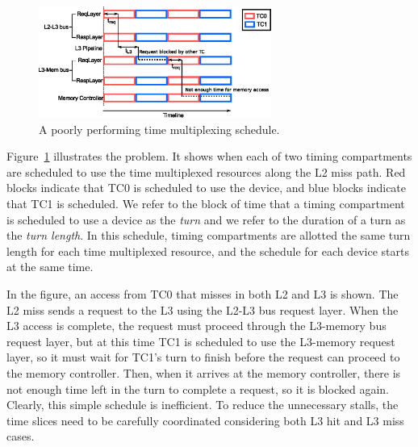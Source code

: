 \begin{figure}
    \begin{center}
        \includegraphics[width=3.0in]{figs/problem.eps}
        \caption{A poorly performing time multiplexing schedule.}
        \label{fig:problem}
		\vspace{-0.2in}
    \end{center}
\end{figure}

Figure~\ref{fig:problem} illustrates the problem. It shows when each of two 
timing compartments are scheduled to use the time multiplexed resources along 
the L2 miss path. Red blocks indicate that TC0 is scheduled to use the device, 
and blue blocks indicate that TC1 is scheduled. We refer to the block of time 
that a timing compartment is scheduled to use a device as the \emph{turn} and 
we refer to the duration of a turn as the \emph{turn length}. In this schedule, 
timing compartments are allotted the same turn length for each time multiplexed 
resource, and the schedule for each device starts at the same time.

In the figure, an access from TC0 that misses in both L2 and L3 is shown. 
The L2 miss sends a request to the L3 using the L2-L3 bus request layer.
When the L3 access is complete, the request must proceed through the L3-memory 
bus request layer, but at this time TC1 is scheduled to use the L3-memory 
request layer, so it must wait for TC1's turn to finish before the request can 
proceed to the memory controller. Then, when it arrives at the memory 
controller, there is not enough time left in the turn to complete a request, so 
it is blocked again. 
Clearly, this simple schedule is inefficient. 
To reduce the unnecessary stalls, the time slices need to be carefully
coordinated considering both L3 hit and L3 miss cases.

